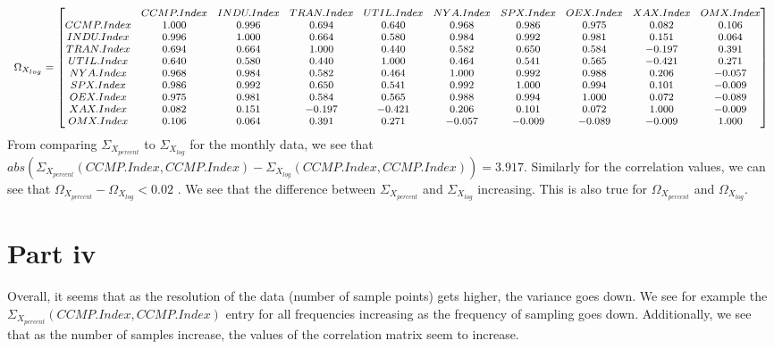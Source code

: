 \documentclass{article}
\begin{document}
\begin{equation*}
\begin{medsize}
\Omega_{X_{log}}=%
\begin{bmatrix}{}
& CCMP.Index & INDU.Index & TRAN.Index & UTIL.Index & NYA.Index & SPX.Index & OEX.Index & XAX.Index & OMX.Index \\ 
  CCMP.Index & 1.000 & 0.996 & 0.694 & 0.640 & 0.968 & 0.986 & 0.975 & 0.082 & 0.106 \\ 
  INDU.Index & 0.996 & 1.000 & 0.664 & 0.580 & 0.984 & 0.992 & 0.981 & 0.151 & 0.064 \\ 
  TRAN.Index & 0.694 & 0.664 & 1.000 & 0.440 & 0.582 & 0.650 & 0.584 & -0.197 & 0.391 \\ 
  UTIL.Index & 0.640 & 0.580 & 0.440 & 1.000 & 0.464 & 0.541 & 0.565 & -0.421 & 0.271 \\ 
  NYA.Index & 0.968 & 0.984 & 0.582 & 0.464 & 1.000 & 0.992 & 0.988 & 0.206 & -0.057 \\ 
  SPX.Index & 0.986 & 0.992 & 0.650 & 0.541 & 0.992 & 1.000 & 0.994 & 0.101 & -0.009 \\ 
  OEX.Index & 0.975 & 0.981 & 0.584 & 0.565 & 0.988 & 0.994 & 1.000 & 0.072 & -0.089 \\ 
  XAX.Index & 0.082 & 0.151 & -0.197 & -0.421 & 0.206 & 0.101 & 0.072 & 1.000 & -0.009 \\ 
  OMX.Index & 0.106 & 0.064 & 0.391 & 0.271 & -0.057 & -0.009 & -0.089 & -0.009 & 1.000 \\ 
  \end{bmatrix}
\end{medsize}
\end{equation*}
From comparing \(\Sigma_{X_{percent}}\) to \(\Sigma_{X_{log}}\) for the monthly data, we see that \(abs(\Sigma_{X_{percent}}(CCMP.Index,CCMP.Index) - \Sigma_{X_{log}}(CCMP.Index,CCMP.Index)) = 3.917 \). Similarly for the correlation values, we can see that \(\Omega_{X_{percent}}- \Omega_{X_{log}} < 0.02 \) . We see that the difference between \(\Sigma_{X_{percent}}\) and \(\Sigma_{X_{log}}\) increasing. This is also true for \(\Omega_{X_{percent}}\) and \(\Omega_{X_{log}}\).

\section*{Part iv}
Overall, it seems that as the resolution of the data (number of sample points) gets higher, the variance goes down. We see for example the \(\Sigma_{X_{percent}}(CCMP.Index,CCMP.Index)\) entry for all frequencies increasing as the frequency of sampling goes down. Additionally, we see that as the number of samples increase, the values of the correlation matrix seem to increase. 
%
%
%
\end{document}
